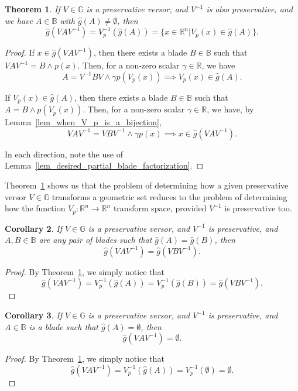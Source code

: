 \documentclass{birkjour}
\newtheorem{thm}{Theorem}[section]
\newtheorem{cor}[thm]{Corollary}
\theoremstyle{definition}
\theoremstyle{remark}
\numberwithin{equation}{section}
\newcommand{\R}{\mathbb{R}}
\newcommand{\B}{\mathbb{B}}
\newcommand{\G}{\mathbb{G}}
\newcommand{\gh}{\hat{g}}
\begin{document}
\begin{thm}\label{thm_how_preservative_versor_transforms}
If $V\in\G$ is a preservative versor, and $V^{-1}$ is also preservative,
and we have $A\in\B$ with $\gh(A)\neq\emptyset$, then
\begin{equation}
\gh(VAV^{-1}) = V_p^{-1}(\gh(A)) = \{x\in\R^n|V_p(x)\in\gh(A)\}.
\end{equation}
\end{thm}
\begin{proof}
If $x\in\gh(VAV^{-1})$, then there exists a blade $B\in\B$
such that $VAV^{-1}=B\wedge p(x)$.  Then, for a non-zero scalar $\gamma\in\R$,
we have
\begin{equation}
A=V^{-1}BV\wedge\gamma p(V_p(x))\implies V_p(x)\in\gh(A).
\end{equation}

If $V_p(x)\in\gh(A)$, then there exists a blade $B\in\B$
such that $A = B\wedge p(V_p(x))$.  Then, for a non-zero scalar $\gamma\in\R$,
we have, by Lemma~\ref{lem_when_V_p_is_a_bijection},
\begin{equation}
VAV^{-1}=VBV^{-1}\wedge\gamma p(x)\implies x\in\gh(VAV^{-1}).
\end{equation}

In each direction, note the use of Lemma~\ref{lem_desired_partial_blade_factorization}.
\end{proof}

Theorem~\ref{thm_how_preservative_versor_transforms} shows us that the
problem of determining how a given preservative
versor $V\in\G$ transforms a geometric set reduces to the problem of determining
how the function $V_p:\R^n\to\R^n$ transform space, provided $V^{-1}$ is preservative too.

\begin{cor}
If $V\in\G$ is a preservative versor, and $V^{-1}$ is preservative, and $A,B\in\B$ are any pair
of blades such that $\gh(A)=\gh(B)$, then
\begin{equation}
\gh(VAV^{-1})=\gh(VBV^{-1}).
\end{equation}
\end{cor}
\begin{proof}
By Theorem~\ref{thm_how_preservative_versor_transforms}, we simply notice that
\begin{equation}
\gh(VAV^{-1})=V_p^{-1}(\gh(A))=V_p^{-1}(\gh(B))=\gh(VBV^{-1}).
\end{equation}
\end{proof}

\begin{cor}
If $V\in\G$ is a preservative versor, and $V^{-1}$ is preservative,
and $A\in\B$ is a blade such that $\gh(A)=\emptyset$, then
\begin{equation}
\gh(VAV^{-1})=\emptyset.
\end{equation}
\end{cor}
\begin{proof}
By Theorem~\ref{thm_how_preservative_versor_transforms}, we simply notice that
\begin{equation}
\gh(VAV^{-1})=V_p^{-1}(\gh(A))=V_p^{-1}(\emptyset)=\emptyset.
\end{equation}
\end{proof}
\end{document}

